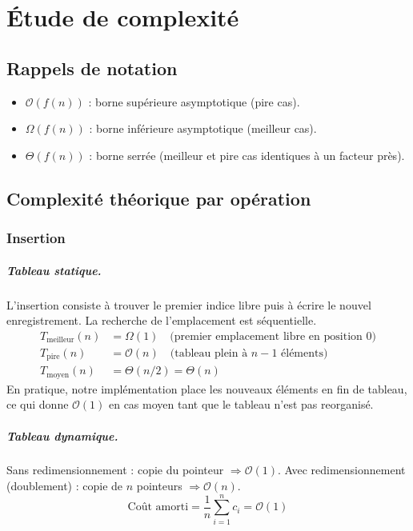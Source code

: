 \documentclass[12pt,a4paper]{report}
\begin{document}
\chapter{Étude de complexité}
\label{chap:complexite}

\section{Rappels de notation}

\begin{itemize}
    \item $\mathcal{O}(f(n))$ : borne supérieure asymptotique (pire cas).
    \item $\Omega(f(n))$ : borne inférieure asymptotique (meilleur cas).
    \item $\Theta(f(n))$ : borne serrée (meilleur et pire cas identiques à un facteur près).
\end{itemize}

\section{Complexité théorique par opération}

\subsection{Insertion}

\paragraph{Tableau statique.}
L'insertion consiste à trouver le premier indice libre puis à écrire le nouvel enregistrement. La recherche de l'emplacement est séquentielle.
\begin{align*}
T_{\text{meilleur}}(n) &= \Omega(1) \quad \text{(premier emplacement libre en position 0)} \\
T_{\text{pire}}(n)     &= \mathcal{O}(n) \quad \text{(tableau plein à } n-1 \text{ éléments)} \\
T_{\text{moyen}}(n)    &= \Theta(n/2) = \Theta(n)
\end{align*}
En pratique, notre implémentation place les nouveaux éléments en fin de tableau, ce qui donne $\mathcal{O}(1)$ en cas moyen tant que le tableau n'est pas reorganisé.

\paragraph{Tableau dynamique.}
Sans redimensionnement : copie du pointeur $\Rightarrow \mathcal{O}(1)$.
Avec redimensionnement (doublement) : copie de $n$ pointeurs $\Rightarrow \mathcal{O}(n)$.
\[
\text{Coût amorti} = \frac{1}{n}\sum_{i=1}^{n} c_i = \mathcal{O}(1)
\]
\end{document}
